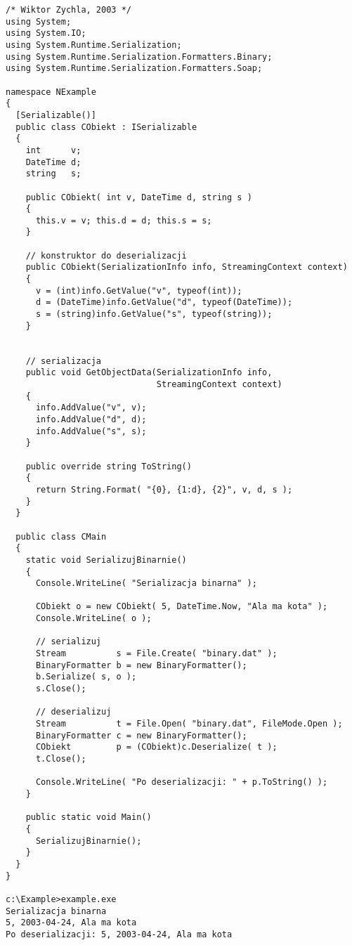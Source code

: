 \begin{scriptsize}
\begin{verbatim}
/* Wiktor Zychla, 2003 */
using System;
using System.IO;
using System.Runtime.Serialization;
using System.Runtime.Serialization.Formatters.Binary;
using System.Runtime.Serialization.Formatters.Soap;

namespace NExample
{
  [Serializable()]
  public class CObiekt : ISerializable
  {
    int      v;
    DateTime d;
    string   s;
	 
    public CObiekt( int v, DateTime d, string s )
    {
      this.v = v; this.d = d; this.s = s;
    }

	// konstruktor do deserializacji
    public CObiekt(SerializationInfo info, StreamingContext context) 
    {
      v = (int)info.GetValue("v", typeof(int));
      d = (DateTime)info.GetValue("d", typeof(DateTime));
      s = (string)info.GetValue("s", typeof(string));
    }


    // serializacja
    public void GetObjectData(SerializationInfo info, 
	                          StreamingContext context)
    {
      info.AddValue("v", v);
      info.AddValue("d", d);
      info.AddValue("s", s);
    }
    
    public override string ToString()
    {
      return String.Format( "{0}, {1:d}, {2}", v, d, s );
    }
  }

  public class CMain
  {
    static void SerializujBinarnie()
    {
      Console.WriteLine( "Serializacja binarna" );

      CObiekt o = new CObiekt( 5, DateTime.Now, "Ala ma kota" );
      Console.WriteLine( o );

      // serializuj
      Stream          s = File.Create( "binary.dat" );
      BinaryFormatter b = new BinaryFormatter();
      b.Serialize( s, o );
      s.Close();

      // deserializuj
      Stream          t = File.Open( "binary.dat", FileMode.Open );
      BinaryFormatter c = new BinaryFormatter();
      CObiekt         p = (CObiekt)c.Deserialize( t );
      t.Close();

      Console.WriteLine( "Po deserializacji: " + p.ToString() );
    }

    public static void Main()
    {
      SerializujBinarnie();
    }
  }
}

c:\Example>example.exe
Serializacja binarna
5, 2003-04-24, Ala ma kota
Po deserializacji: 5, 2003-04-24, Ala ma kota
\end{verbatim}
\end{scriptsize}

